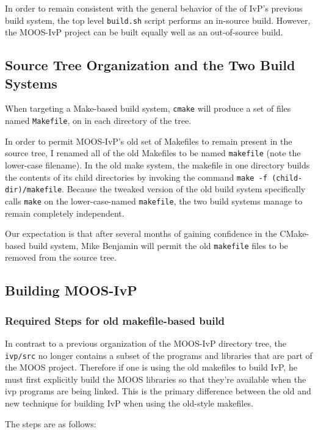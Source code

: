 \documentclass[letterpaper,10pt]{article}
\begin{document}
In order to remain consistent with the general behavior of the of IvP's
previous build system, the top level \verb|build.sh| script performs an
in-source build.  However, the MOOS-IvP project can be built equally well
as an out-of-source build.

\subsection{Source Tree Organization and the Two Build Systems}
When targeting a Make-based build system, \verb|cmake| will produce a set
of files named \verb|Makefile|, on in each directory of the tree.

In order to permit MOOS-IvP's old set of Makefiles to remain present in
the source tree, I renamed all of the old Makefiles to be named \verb|makefile|
(note the lower-case filename).  In the old make system, the makefile
in one directory builds the contents of its child directories by invoking
the command \verb|make -f (child-dir)/makefile|.  Because the tweaked version of the 
old build system specifically calls \verb|make| on the lower-case-named \verb|makefile|,
the two build systems manage to remain completely independent.

Our expectation is that after several months of gaining confidence in the CMake-based
build system, Mike Benjamin will permit the old \verb|makefile| files to be 
removed from the source tree.

\subsection{Building MOOS-IvP}

\subsubsection{Required Steps for old makefile-based build}
In contrast to a previous organization of the MOOS-IvP directory tree, the
\verb|ivp/src| no longer contains a subset of the programs and libraries that are
part of the MOOS project.  Therefore if one is using the old makefiles to build
IvP, he must first explicitly build the MOOS libraries so that they're available when
the ivp programs are being linked.  This is the primary difference between the old
and new technique for building IvP when using the old-style makefiles.

The steps are as follows:
\end{document}
